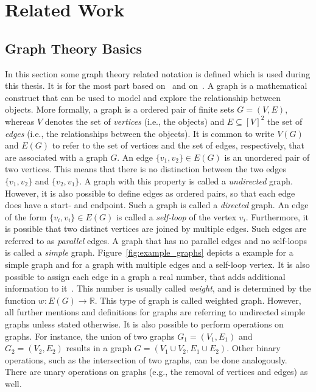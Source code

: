 \chapter{Related Work}
\label{cha:related-work}


\section{Graph Theory Basics}
\label{sec:graph-theory-basics}

In this section some graph theory related notation is defined which is used during this thesis.
It is for the most part based on~\cite{Thulasiraman1992} and on~\cite{Diestel2012}.
A graph is a mathematical construct that can be used to model and explore the relationship between objects.
More formally, a graph is a ordered pair of finite sets \(G = (V, E)\), whereas \(V\) denotes the set of \emph{vertices} (i.e., the objects) and \(E \subseteq [V]^{2} \) the set of \emph{edges} (i.e., the relationships between the objects).
It is common to write \(V(G)\) and \(E(G)\) to refer to the set of vertices and the set of edges, respectively, that are associated with a graph \(G\).
An edge \(\{v_1, v_2\} \in E(G)\) is an unordered pair of two vertices.
This means that there is no distinction between the two edges \(\{v_1, v_2 \}\) and \(\{v_2, v_1\}\).
A graph with this property is called a \emph{undirected} graph.
However, it is also possible to define edges as ordered pairs, so that each edge does have a start- and endpoint.
Such a graph is called a \emph{directed} graph.
An edge of the form \(\{v_i, v_i\} \in E(G)\) is called a \emph{self-loop} of the vertex \(v_i\).
Furthermore, it is possible that two distinct vertices are joined by multiple edges.
Such edges are referred to as \emph{parallel} edges.
A graph that has no parallel edges and no self-loops is called a \emph{simple} graph.
Figure~\ref{fig:example_graphs} depicts a example for a simple graph and for a graph with multiple edges and a self-loop vertex.
It is also possible to assign each edge in a graph a real number, that adds additional information to it~\cite{Cormen2009}.
This number is usually called \emph{weight}, and is determined by the function \(w : E(G) \rightarrow \mathbb{R}\).
This type of graph is called weighted graph.
However, all further mentions and definitions for graphs are referring to undirected simple graphs unless stated otherwise.
It is also possible to perform operations on graphs.
For instance, the union of two graphs \(G_{1} = (V_{1}, E_{1})\) and \(G_{2} = (V_{2}, E_{2})\) results in a graph \(G = (V_{1} \cup V_{2}, E_{1} \cup E_{2})\).
Other binary operations, such as the intersection of two graphs, can be done analogously.
There are unary operations on graphs (e.g., the removal of vertices and edges) as well.

